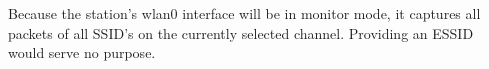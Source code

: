 Because the station's wlan0 interface will be in monitor mode, it captures all packets of all SSID's on the currently selected channel. Providing an ESSID would serve no purpose.
